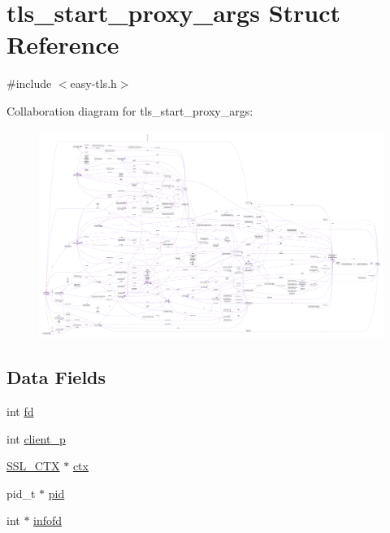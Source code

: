\hypertarget{structtls__start__proxy__args}{}\section{tls\+\_\+start\+\_\+proxy\+\_\+args Struct Reference}
\label{structtls__start__proxy__args}


{\ttfamily \#include $<$easy-\/tls.\+h$>$}



Collaboration diagram for tls\+\_\+start\+\_\+proxy\+\_\+args\+:\nopagebreak
\begin{figure}[H]
\begin{center}
\leavevmode
\includegraphics[width=350pt]{structtls__start__proxy__args__coll__graph}
\end{center}
\end{figure}
\subsection*{Data Fields}
\begin{DoxyCompactItemize}
\item 
int \hyperlink{structtls__start__proxy__args_a6f8059414f0228f0256115e024eeed4b}{fd}
\item 
int \hyperlink{structtls__start__proxy__args_ab34c46dc01ec481d13f7bfad0044e34c}{client\+\_\+p}
\item 
\hyperlink{crypto_2ossl__typ_8h_a1a21892c1193ee6eb572c2c72d3924ca}{S\+S\+L\+\_\+\+C\+TX} $\ast$ \hyperlink{structtls__start__proxy__args_ad5433bcc8a463fb4df3ce5912bb11fe3}{ctx}
\item 
pid\+\_\+t $\ast$ \hyperlink{structtls__start__proxy__args_a5afce35563ade4cfbdd9e39f9138b41b}{pid}
\item 
int $\ast$ \hyperlink{structtls__start__proxy__args_a66ef379c65277c233d179a1ac4129e32}{infofd}
\end{DoxyCompactItemize}


